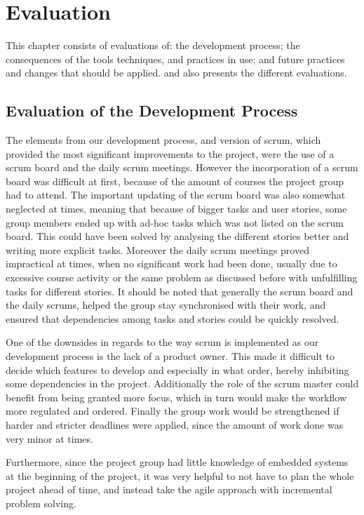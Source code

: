 \chapter{Evaluation} %
\label{cha:evaluation}
This chapter consists of evaluations of: the development process; the consequences of the tools techniques, and practices in use; and future practices and changes that should be applied.
 and  also presents the different evaluations.

\section{Evaluation of the Development Process} %
\label{sec:evaluation_of_the_development_process}

The elements from our development process, and version of scrum, which provided the most significant improvements to the project, were the use of a scrum board and the daily scrum meetings.
However the incorporation of a scrum board was difficult at first, because of the amount of courses the project group had to attend.
The important updating of the scrum board was also somewhat neglected at times, meaning that because of bigger tasks and user stories, some group members ended up with ad-hoc tasks which was not listed on the scrum board.
This could have been solved by analysing the different stories better and writing more explicit tasks.
Moreover the daily scrum meetings proved impractical at times, when no significant work had been done, usually due to excessive course activity or the same problem as discussed before with unfulfilling tasks for different stories.
It should be noted that generally the scrum board and the daily scrums, helped the group stay synchronised with their work, and ensured that dependencies among tasks and stories could be quickly resolved.

One of the downsides in regards to the way scrum is implemented as our development process is the lack of a product owner.
This made it difficult to decide which features to develop and especially in what order, hereby inhibiting some dependencies in the project.
Additionally the role of the scrum master could benefit from being granted more focus, which in turn would make the workflow more regulated and ordered.
Finally the group work would be strengthened if harder and stricter deadlines were applied, since the amount of work done was very minor at times.   

Furthermore, since the project group had little knowledge of embedded systems at the beginning of the project, it was very helpful to not have to plan the whole project ahead of time, and instead take the agile approach with incremental problem solving.

